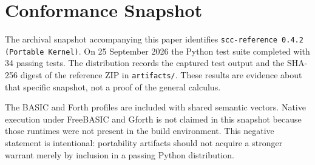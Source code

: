 \section{Conformance Snapshot}
The archival snapshot accompanying this paper identifies \texttt{scc-reference 0.4.2 (Portable Kernel)}. On 25 September 2026 the Python test suite completed with 34 passing tests. The distribution records the captured test output and the SHA-256 digest of the reference ZIP in \texttt{artifacts/}. These results are evidence about that specific snapshot, not a proof of the general calculus.

The BASIC and Forth profiles are included with shared semantic vectors. Native execution under FreeBASIC and Gforth is not claimed in this snapshot because those runtimes were not present in the build environment. This negative statement is intentional: portability artifacts should not acquire a stronger warrant merely by inclusion in a passing Python distribution.